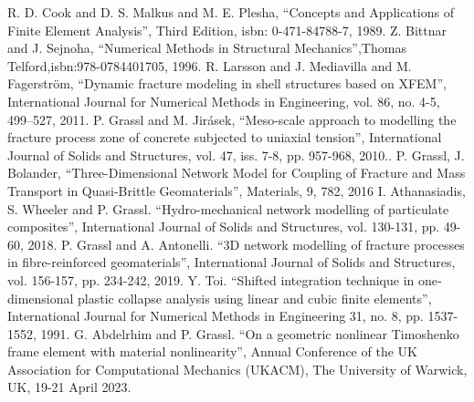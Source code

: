 \documentclass[a4paper]{article}
\begin{document}
\begin{thebibliography}{99}
 R. D. Cook and D. S. Malkus and M. E. Plesha, ``Concepts and Applications of Finite Element Analysis'', Third Edition, isbn: 0-471-84788-7, 1989.
 Z. Bittnar and J. Sejnoha, ``Numerical Methods in Structural Mechanics'',Thomas Telford,isbn:978-0784401705, 1996.
 R. Larsson and J. Mediavilla and M. Fagerström, ``Dynamic fracture modeling in shell structures based on XFEM'', International Journal for Numerical Methods in Engineering, vol. 86, no. 4-5, 499--527, 2011.
 P. Grassl and M. Jir\'{a}sek, ``Meso-scale approach to modelling the fracture process zone of concrete subjected to uniaxial tension'', International Journal of Solids and Structures, vol. 47, iss. 7-8, pp. 957-968, 2010..
 P. Grassl, J. Bolander, ``Three-Dimensional Network Model for Coupling of Fracture and Mass Transport in Quasi-Brittle Geomaterials'', Materials, 9, 782, 2016
 I. Athanasiadis, S. Wheeler and P. Grassl. ``Hydro-mechanical network modelling of particulate composites'', International Journal of Solids and Structures, vol. 130-131, pp. 49-60, 2018.
 P. Grassl and A. Antonelli. ``3D network modelling of fracture processes in fibre-reinforced geomaterials'', International Journal of Solids and Structures, vol. 156-157, pp. 234-242, 2019.
 Y. Toi. ``Shifted integration technique in one‐dimensional plastic collapse analysis using linear and cubic finite elements'', International Journal for Numerical Methods in Engineering 31, no. 8, pp. 1537-1552, 1991.
 G. Abdelrhim and P. Grassl. ``On a geometric nonlinear Timoshenko frame element with material nonlinearity'', Annual Conference of the UK Association for Computational Mechanics (UKACM), The University of Warwick, UK, 19-21 April 2023.
\end{thebibliography}
\end{document}
